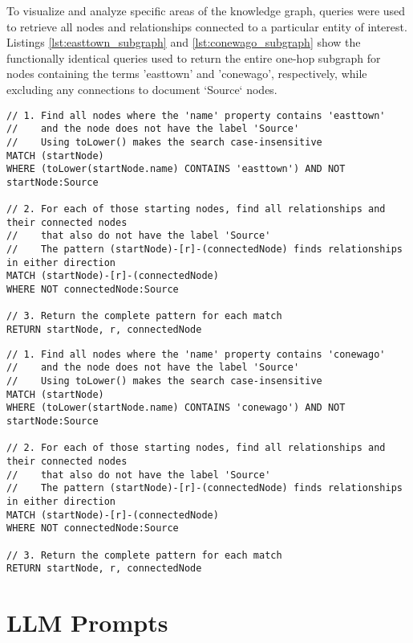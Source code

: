 To visualize and analyze specific areas of the knowledge graph, queries were used to retrieve all nodes and relationships connected to a particular entity of interest. Listings \ref{lst:easttown_subgraph} and \ref{lst:conewago_subgraph} show the functionally identical queries used to return the entire one-hop subgraph for nodes containing the terms 'easttown' and 'conewago', respectively, while excluding any connections to document `Source` nodes.

\begin{lstlisting}[style=cypher, caption={Retrieving the subgraph for all 'Easttown' nodes.}, label={lst:easttown_subgraph}]
// 1. Find all nodes where the 'name' property contains 'easttown'
//    and the node does not have the label 'Source'
//    Using toLower() makes the search case-insensitive
MATCH (startNode)
WHERE (toLower(startNode.name) CONTAINS 'easttown') AND NOT startNode:Source

// 2. For each of those starting nodes, find all relationships and their connected nodes
//    that also do not have the label 'Source'
//    The pattern (startNode)-[r]-(connectedNode) finds relationships in either direction
MATCH (startNode)-[r]-(connectedNode)
WHERE NOT connectedNode:Source

// 3. Return the complete pattern for each match
RETURN startNode, r, connectedNode
\end{lstlisting}

\begin{lstlisting}[style=cypher, caption={Retrieving the subgraph for all 'Conewago' nodes.}, label={lst:conewago_subgraph}]
// 1. Find all nodes where the 'name' property contains 'conewago'
//    and the node does not have the label 'Source'
//    Using toLower() makes the search case-insensitive
MATCH (startNode)
WHERE (toLower(startNode.name) CONTAINS 'conewago') AND NOT startNode:Source

// 2. For each of those starting nodes, find all relationships and their connected nodes
//    that also do not have the label 'Source'
//    The pattern (startNode)-[r]-(connectedNode) finds relationships in either direction
MATCH (startNode)-[r]-(connectedNode)
WHERE NOT connectedNode:Source

// 3. Return the complete pattern for each match
RETURN startNode, r, connectedNode
\end{lstlisting}

\chapter{LLM Prompts}
\label{app:prompts}

